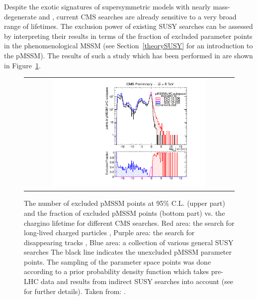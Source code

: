 
Despite the exotic signatures of supersymmetric models with nearly mass-degenerate \chipm and \chiO, current CMS searches are already sensitive to a very broad range of lifetimes.
The exclusion power of existing SUSY searches can be assessed by interpreting their results in terms of the fraction of excluded parameter points in the phenomenological MSSM (see Section~\ref{theorySUSY} for an introduction to the pMSSM). 
The results of such a study which has been performed in \cite{bib:CMS:DT_8TeV} are shown in Figure~\ref{fig:pMSSMplot}. 
\begin{figure}[!t]
\vspace{20pt}
  \centering 
  \begin{tabular}{c}
    \includegraphics[width=0.75\textwidth]{figures/analysis/pMSSM_vs_ctau.pdf}
  \end{tabular}
  \caption{The number of excluded pMSSM points at 95\% C.L. (upper part) and the fraction of excluded pMSSM points (bottom part) vs. the chargino lifetime for different CMS searches.
           Red area: the search for long-lived charged particles \cite{bib:CMS:HSCP_8TeV},
           Purple area: the search for disappearing tracks  \cite{bib:CMS:DT_8TeV},
           Blue area: a collection of various general SUSY searches \cite{bib:CMS:pMSSMinterpretation_7TeV_PAS}
           The black line indicates the unexcluded pMSSM parameter points.
           The sampling of the parameter space points was done according to a prior probability density function which takes pre-LHC data and results from indirect SUSY searches into account (see \cite{bib:CMS:HSCPReinterpreation_PAS} for further details).
           Taken from: \cite{bib:pMSSMplot_source_from_DT}.}
  \label{fig:pMSSMplot}
\vspace{20pt}
\end{figure}
